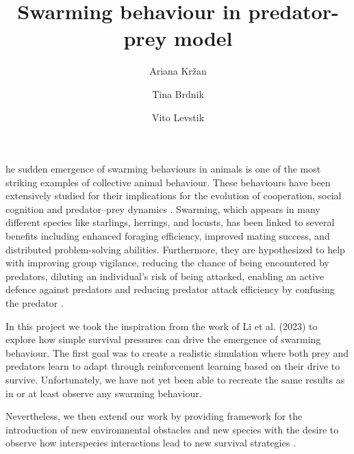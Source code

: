 \documentclass[9pt]{pnas-new}
\title{Swarming behaviour in predator-prey model}
\author{Ariana Kržan}
\author{Tina Brdnik}
\author{Vito Levstik}
\affil{Collective behaviour course research seminar report}
\begin{document}
	
	\verticaladjustment{-2pt}
	
	\maketitle
	\thispagestyle{firststyle}
	
	he sudden emergence of swarming behaviours in animals is one of the most striking examples of collective animal behaviour. 
	These behaviours have been extensively studied for their implications for the evolution of cooperation, 
	social cognition and predator–prey dynamics \cite{olson2013predator}. Swarming, which appears in many different species like starlings, 
	herrings, and locusts, has been linked to several benefits including enhanced foraging efficiency, improved mating success, and distributed problem-solving abilities. 
	Furthermore, they are hypothesized to help with improving group vigilance, reducing the chance of being encountered by predators, 
	diluting an individual's risk of being attacked, enabling an active defence against predators and reducing predator attack efficiency by confusing the predator \cite{li2023predator}.
	
	In this project we took the inspiration from the work of Li et al. (2023) \cite{li2023predator} to explore how simple survival pressures can drive the emergence of swarming behaviour. 
	The first goal was to create a realistic simulation where both prey and predators learn to adapt through reinforcement learning based on their drive to survive.
	Unfortunately, we have not yet been able to recreate the same results as in \cite{li2023predator} or at least observe any swarming behaviour.
	
	Nevertheless, we then extend our work by providing framework for the introduction of new environmental obstacles and new species with the desire to observe how interspecies interactions lead to new survival strategies \cite{sapkota2020hunting}.
	
\end{document}
